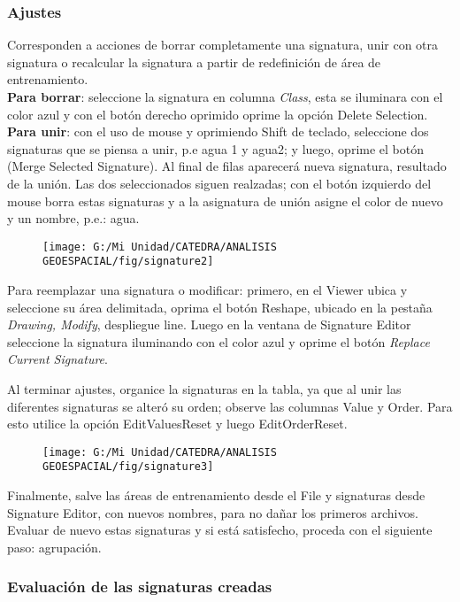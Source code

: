 \documentclass[a4paper,oneside,11pt,]{article}
\begin{document}
\subsubsection{Ajustes} 
Corresponden a acciones de borrar completamente una signatura, unir con otra signatura o recalcular la signatura a partir de redefinición de área de entrenamiento.\\
\textbf{Para borrar}: seleccione la signatura en columna \emph{Class}, esta se iluminara con el color azul y con el botón derecho oprimido oprime la opción Delete Selection.\\
\textbf{Para unir}: con el uso de mouse y oprimiendo Shift de teclado, seleccione dos signaturas que se piensa a unir, p.e agua 1 y agua2; y luego, oprime el botón   (Merge Selected Signature). Al final de filas aparecerá nueva signatura, resultado de la unión. Las dos seleccionados siguen realzadas; con el botón izquierdo del mouse borra estas signaturas y a la asignatura de unión asigne el color de nuevo y un nombre, p.e.: agua.

\begin{figure}
\centering
\texttt{[image: G:/Mi Unidad/CATEDRA/ANALISIS GEOESPACIAL/fig/signature2]}
\end{figure}

Para reemplazar una signatura o modificar: primero, en el Viewer ubica y seleccione su área delimitada, oprima el botón    Reshape, ubicado en la pestaña \emph{Drawing, Modify}, despliegue line. Luego en la ventana de Signature Editor  seleccione la signatura iluminando con el color azul y oprime el botón \emph{Replace Current Signature}. 
\par Al terminar ajustes, organice la signaturas en la tabla, ya que al unir las diferentes signaturas se alteró su orden; observe las columnas Value y Order. Para esto utilice la opción Edit\textrightarrow Values\textrightarrow Reset y luego Edit\textrightarrow Order\textrightarrow Reset.

\begin{figure}
\centering
\texttt{[image: G:/Mi Unidad/CATEDRA/ANALISIS GEOESPACIAL/fig/signature3]}
\end{figure}

Finalmente, salve las áreas de entrenamiento desde el File y signaturas desde Signature Editor, con nuevos nombres, para no dañar los primeros archivos. Evaluar de nuevo estas signaturas y si está satisfecho, proceda con el siguiente paso: agrupación. 

\subsubsection{Evaluación de las signaturas creadas}
\end{document}
